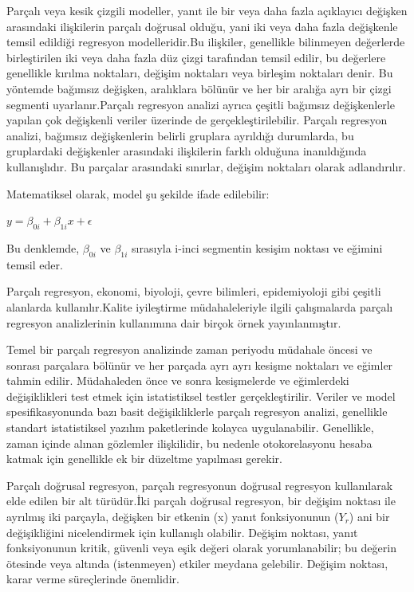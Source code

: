 \documentclass[12pt,twoside]{deuthesis}
\begin{document}
Parçalı veya kesik çizgili modeller, yanıt ile bir veya daha fazla açıklayıcı değişken arasındaki ilişkilerin parçalı doğrusal olduğu, yani iki veya daha fazla değişkenle temsil edildiği regresyon modelleridir.Bu ilişkiler, genellikle bilinmeyen değerlerde birleştirilen iki veya daha fazla düz çizgi tarafından temsil edilir, bu değerlere genellikle kırılma noktaları, değişim noktaları veya birleşim noktaları denir. Bu yöntemde bağımsız değişken, aralıklara bölünür ve her bir aralığa ayrı bir çizgi segmenti uyarlanır.Parçalı regresyon analizi ayrıca çeşitli bağımsız değişkenlerle yapılan çok değişkenli veriler üzerinde de gerçekleştirilebilir. Parçalı regresyon analizi, bağımsız değişkenlerin belirli gruplara ayrıldığı durumlarda, bu gruplardaki değişkenler arasındaki ilişkilerin farklı olduğuna inanıldığında kullanışlıdır. Bu parçalar arasındaki sınırlar, değişim noktaları olarak adlandırılır.

Matematiksel olarak, model şu şekilde ifade edilebilir:

\(y = \beta_{0i} + \beta_{1i} x + \epsilon\)

Bu denklemde, \(\beta_{0i}\) ve \(\beta_{1i}\) sırasıyla i-inci segmentin kesişim noktası ve eğimini temsil eder.

Parçalı regresyon, ekonomi, biyoloji, çevre bilimleri, epidemiyoloji gibi çeşitli alanlarda kullanılır.Kalite iyileştirme müdahaleleriyle ilgili çalışmalarda parçalı regresyon analizlerinin kullanımına dair birçok örnek yayınlanmıştır.

Temel bir parçalı regresyon analizinde zaman periyodu müdahale öncesi ve sonrası parçalara bölünür ve her parçada ayrı ayrı kesişme noktaları ve eğimler tahmin edilir. Müdahaleden önce ve sonra kesişmelerde ve eğimlerdeki değişiklikleri test etmek için istatistiksel testler gerçekleştirilir. Veriler ve model spesifikasyonunda bazı basit değişikliklerle parçalı regresyon analizi, genellikle standart istatistiksel yazılım paketlerinde kolayca uygulanabilir. Genellikle, zaman içinde alınan gözlemler ilişkilidir, bu nedenle otokorelasyonu hesaba katmak için genellikle ek bir düzeltme yapılması gerekir.

Parçalı doğrusal regresyon, parçalı regresyonun doğrusal regresyon kullanılarak elde edilen bir alt türüdür.İki parçalı doğrusal regresyon, bir değişim noktası ile ayrılmış iki parçayla, değişken bir etkenin (x) yanıt fonksiyonunun (\(Y_{r}\)) ani bir değişikliğini nicelendirmek için kullanışlı olabilir. Değişim noktası, yanıt fonksiyonunun kritik, güvenli veya eşik değeri olarak yorumlanabilir; bu değerin ötesinde veya altında (istenmeyen) etkiler meydana gelebilir. Değişim noktası, karar verme süreçlerinde önemlidir.
\end{document}
